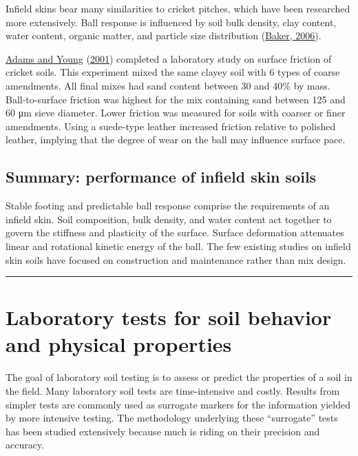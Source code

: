 \documentclass[
  letterpaper,
  openany]{book}
\begin{document}
Infield skins bear many similarities to cricket pitches, which have been researched more extensively.
Ball response is influenced by soil bulk density, clay content, water content, organic matter, and particle size distribution (\protect\hyperlink{ref-Baker2006}{Baker, 2006}).

\protect\hyperlink{ref-Adams2001a}{Adams and Young} (\protect\hyperlink{ref-Adams2001a}{2001}) completed a laboratory study on surface friction of cricket soils.
This experiment mixed the same clayey soil with 6 types of coarse amendments.
All final mixes had sand content between 30 and 40\% by mass.
Ball-to-surface friction was highest for the mix containing sand between 125 and 60 μm sieve diameter.
Lower friction was measured for soils with coarser or finer amendments.
Using a suede-type leather increased friction relative to polished leather, implying that the degree of wear on the ball may influence surface pace.

\hypertarget{summary-performance-of-infield-skin-soils}{%
\subsection{Summary: performance of infield skin soils}\label{summary-performance-of-infield-skin-soils}}

Stable footing and predictable ball response comprise the requirements of an infield skin.
Soil composition, bulk density, and water content act together to govern the stiffness and plasticity of the surface.
Surface deformation attenuates linear and rotational kinetic energy of the ball.
The few existing studies on infield skin soils have focused on construction and maintenance rather than mix design.

\begin{center}\rule{0.5\linewidth}{0.5pt}\end{center}

\hypertarget{lab-methods-review}{%
\section{Laboratory tests for soil behavior and physical properties}\label{lab-methods-review}}

The goal of laboratory soil testing is to assess or predict the properties of a soil in the field.
Many laboratory soil tests are time-intensive and costly.
Results from simpler tests are commonly used as surrogate markers for the information yielded by more intensive testing.
The methodology underlying these ``surrogate'' tests has been studied extensively because much is riding on their precision and accuracy.
\end{document}
